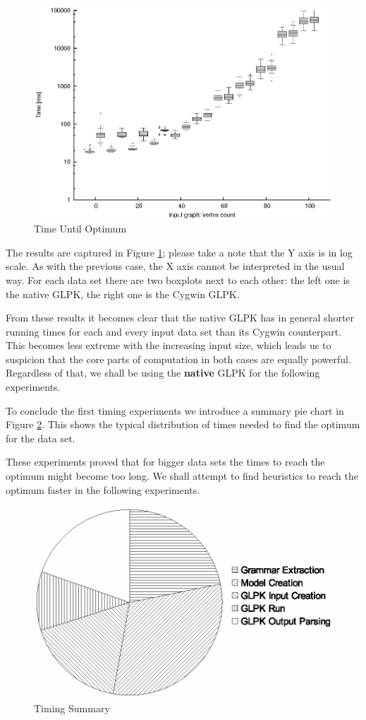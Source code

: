 \begin{figure}
  \caption{Time Until Optimum}
  \label{image-experiment-time-until-optimum}
  \centering
    \includegraphics[width=\textwidth]{images/experiments/time-till-optimum}
\end{figure}

The results are captured in Figure \ref{image-experiment-time-until-optimum}; please take a note that the Y axis is in log scale. As with the previous case, the X axis cannot be interpreted in the usual way. For each data set there are two boxplots next to each other: the left one is the native GLPK, the right one is the Cygwin GLPK.

From these results it becomes clear that the native GLPK has in general shorter running times for each and every input data set than its Cygwin counterpart. This becomes less extreme with the increasing input size, which leads us to suspicion that the core parts of computation in both cases are equally powerful. Regardless of that, we shall be using the \textbf{native} GLPK for the following experiments.

To conclude the first timing experiments we introduce a summary pie chart in Figure \ref{image-experiment-timing-summary}. This shows the typical distribution of times needed to find the optimum for the  data set.

These experiments proved that for bigger data sets the times to reach the optimum might become too long. We shall attempt to find heuristics to reach the optimum faster in the following experiments.

\begin{figure}
  \caption{Timing Summary}
  \label{image-experiment-timing-summary}
  \centering
    \includegraphics[width=.6\textwidth]{images/experiments/timing-pie}
\end{figure}

